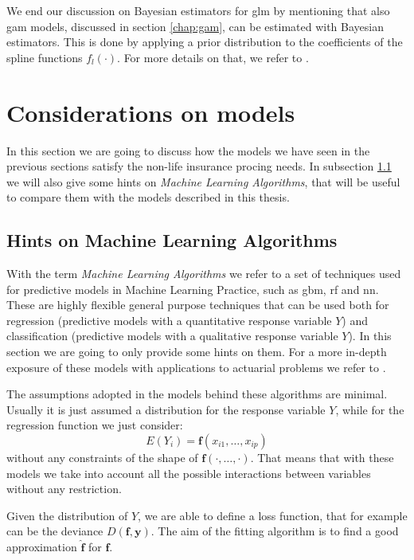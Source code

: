 \documentclass[a4paper, twoside, openright, 12pt]{report}
\theoremstyle{definition}
\theoremstyle{definition}
\theoremstyle{definition}
\theoremstyle{remark}
\begin{document}
We end our discussion on Bayesian estimators for \ac{glm} by mentioning that also \ac{gam} models, discussed in section \ref{chap:gam}, can be estimated with Bayesian estimators. This is done by applying a prior distribution to the coefficients of the spline functions \(f_l(\cdot)\). For more details on that, we refer to \autocite{bayes-gam}.

\newpage

\hypertarget{chap:considerations-on-models}{%
\section{Considerations on models}\label{chap:considerations-on-models}}

In this section we are going to discuss how the models we have seen in the previous sections satisfy the non-life insurance procing needs. In subsection \ref{chap:ml-techniques} we will also give some hints on \emph{Machine Learning Algorithms}, that will be useful to compare them with the models described in this thesis.

\hypertarget{chap:ml-techniques}{%
\subsection{Hints on Machine Learning Algorithms}\label{chap:ml-techniques}}

With the term \emph{Machine Learning Algorithms} we refer to a set of techniques used for predictive models in Machine Learning Practice, such as \ac{gbm}, \ac{rf} and \ac{nn}. These are highly flexible general purpose techniques that can be used both for regression (predictive models with a quantitative response variable \(Y\)) and classification (predictive models with a qualitative response variable \(Y\)). In this section we are going to only provide some hints on them. For a more in-depth exposure of these models with applications to actuarial problems we refer to \autocite{wuthrich-data-analytics}.

The assumptions adopted in the models behind these algorithms are minimal. Usually it is just assumed a distribution for the response variable \(Y\), while for the regression function we just consider:
\[
E(Y_i) = \boldsymbol{f}(x_{i1}, \dots, x_{ip})
\]
without any constraints of the shape of \(\boldsymbol{f}(\cdot,\dots,\cdot)\). That means that with these models we take into account all the possible interactions between variables without any restriction.

Given the distribution of \(Y\), we are able to define a loss function, that for example can be the deviance \(D(\boldsymbol{f}, \boldsymbol{y})\). The aim of the fitting algorithm is to find a good approximation \(\hat{\boldsymbol{f}}\) for \(\boldsymbol{f}\).
\end{document}
